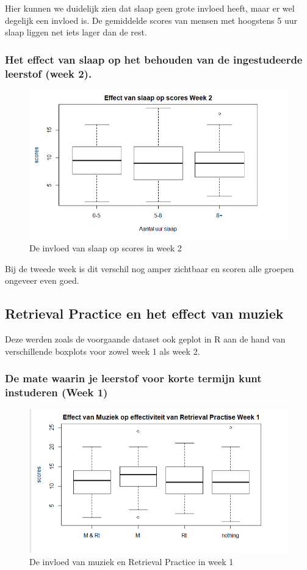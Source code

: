 \documentclass{hogent-article}
\begin{document}
Hier kunnen we duidelijk zien dat slaap geen grote invloed heeft, maar er wel degelijk een invloed is. De gemiddelde scores van mensen met hoogstens 5 uur slaap liggen net iets lager dan de rest.

\subsubsection{Het effect van slaap op het behouden van de ingestudeerde leerstof (week 2).}

\begin{figure}[H]
	\includegraphics[width=\linewidth]{slaapGraph2}
    \caption{De invloed van slaap op scores in week 2}
\end{figure}

Bij de tweede week is dit verschil nog amper zichtbaar en scoren alle groepen ongeveer even goed.

\subsection{Retrieval Practice en het effect van muziek}

Deze werden zoals de voorgaande dataset ook geplot in R aan de hand van verschillende boxplots voor zowel week 1 als week 2.

\subsubsection{De mate waarin je leerstof voor korte termijn kunt instuderen (Week 1)}

\begin{figure}[H]
	\includegraphics[width=\linewidth]{muziekGraph1}
    \caption{De invloed van muziek en Retrieval Practice in week 1}
\end{figure}
\end{document}
